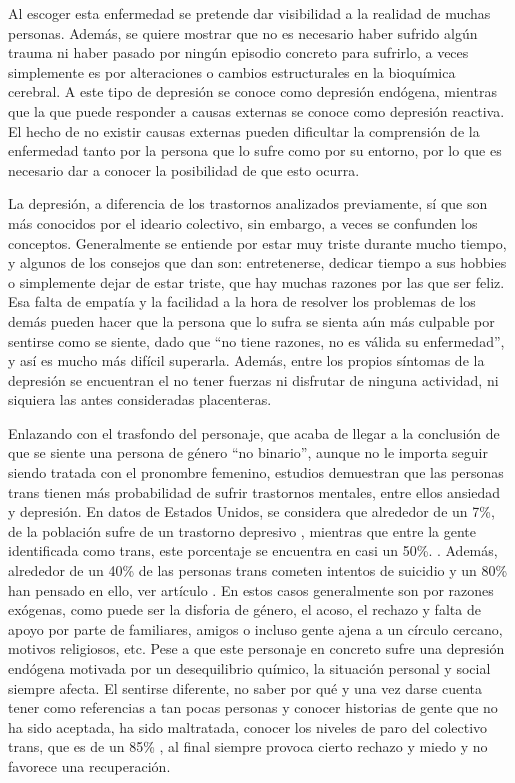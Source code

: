 \documentclass[12pt, a4paper,twoside,titlepage]{book}
\begin{document}
\begin{itemize}
{Al escoger esta enfermedad se pretende dar visibilidad a la realidad de muchas personas. Además, se quiere mostrar que no es necesario haber sufrido algún trauma ni haber pasado por ningún episodio concreto para sufrirlo, a veces simplemente es por alteraciones o cambios estructurales en la bioquímica cerebral. A este tipo de depresión se conoce como depresión endógena, mientras que la que puede responder a causas externas se conoce como depresión reactiva. El hecho de no existir causas externas pueden dificultar la comprensión de la enfermedad tanto por la persona que lo sufre como por su entorno, por lo que es necesario dar a conocer la posibilidad de que esto ocurra. 

La depresión, a diferencia de los trastornos analizados previamente, sí que son más conocidos por el ideario colectivo, sin embargo, a veces se confunden los conceptos. Generalmente se entiende por estar muy triste durante mucho tiempo, y algunos de los consejos que dan son: entretenerse, dedicar tiempo a sus hobbies o simplemente dejar de estar triste, que hay muchas razones por las que ser feliz. Esa falta de empatía y la facilidad a la hora de resolver los problemas de los demás pueden hacer que la persona que lo sufra se sienta aún más culpable por sentirse como se siente, dado que ``no tiene razones, no es válida su enfermedad'', y así es mucho más difícil superarla. Además, entre los propios síntomas de la depresión se encuentran el no tener fuerzas ni disfrutar de ninguna actividad, ni siquiera las antes consideradas placenteras. 

Enlazando con el trasfondo del personaje, que acaba de llegar a la conclusión de que se siente una persona de género ``no binario'', aunque no le importa seguir siendo tratada con el pronombre femenino, estudios demuestran que las personas trans tienen más probabilidad de sufrir trastornos mentales, entre ellos ansiedad y depresión. En datos de Estados Unidos, se considera que alrededor de un 7\%, de la población sufre de un trastorno depresivo  \cite{articuloDEP3}, mientras que entre la gente identificada como trans, este porcentaje se encuentra en casi un 50\%. \cite{articuloDEP4}. Además, alrededor de un 40\% de las personas trans cometen intentos de suicidio y un 80\% han pensado en ello, ver artículo \cite{articuloDEP5}. En estos casos generalmente son por razones exógenas, como puede ser la disforia de género,  el acoso, el rechazo y falta de apoyo por parte de familiares, amigos o incluso gente ajena a un círculo cercano, motivos religiosos, etc. 
Pese a que este personaje en concreto sufre una depresión endógena motivada por un desequilibrio químico, la situación personal y social siempre afecta. El sentirse diferente, no saber por qué y una vez darse cuenta tener como referencias a tan pocas personas y conocer historias de gente que no ha sido aceptada, ha sido maltratada, conocer los niveles de paro del colectivo trans, que es de un 85\%  \cite{articuloDEP6}, al final siempre provoca cierto rechazo y miedo y no favorece una recuperación. 

}
\end{itemize}
\end{document}
